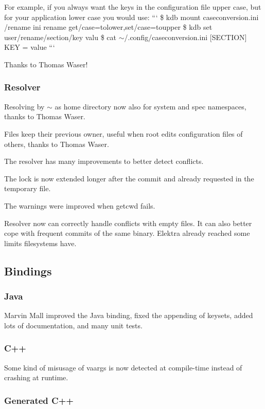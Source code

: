 For example, if you always want the keys in the configuration file upper case, but for your application lower case you would use\+: ``` \$ kdb mount caseconversion.\+ini /rename ini rename get/case=tolower,set/case=toupper \$ kdb set user/rename/section/key valu \$ cat $\sim$/.config/caseconversion.\+ini \mbox{[}S\+E\+C\+T\+I\+O\+N\mbox{]} K\+E\+Y = value ```

Thanks to Thomas Waser!

\subsubsection*{Resolver}

Resolving by $\sim$ as home directory now also for system and spec namespaces, thanks to Thomas Waser.

Files keep their previous owner, useful when root edits configuration files of others, thanks to Thomas Waser.

The resolver has many improvements to better detect conflicts.

The lock is now extended longer after the commit and already requested in the temporary file.

The warnings were improved when {\ttfamily getcwd} fails.

Resolver now can correctly handle conflicts with empty files. It can also better cope with frequent commits of the same binary. Elektra already reached some limits filesystems have.

\subsection*{Bindings}

\subsubsection*{Java}

Marvin Mall improved the Java binding, fixed the appending of keysets, added lots of documentation, and many unit tests.

\subsubsection*{C++}

Some kind of misusage of vaargs is now detected at compile-\/time instead of crashing at runtime.

\subsubsection*{Generated C++}

